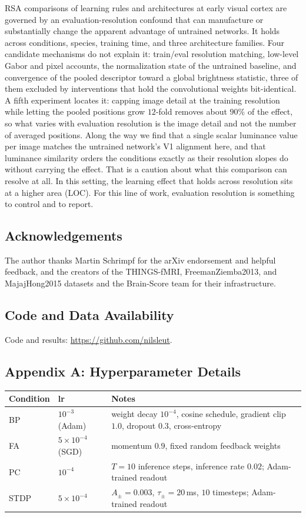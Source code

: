 \documentclass[10pt,twocolumn]{article}
\begin{document}
RSA comparisons of learning rules and architectures at early visual cortex are governed by an evaluation-resolution confound that can manufacture or substantially change the apparent advantage of untrained networks. It holds across conditions, species, training time, and three architecture families. Four candidate mechanisms do not explain it: train/eval resolution matching, low-level Gabor and pixel accounts, the normalization state of the untrained baseline, and convergence of the pooled descriptor toward a global brightness statistic, three of them excluded by interventions that hold the convolutional weights bit-identical. A fifth experiment locates it: capping image detail at the training resolution while letting the pooled positions grow $12$-fold removes about $90\%$ of the effect, so what varies with evaluation resolution is the image detail and not the number of averaged positions. Along the way we find that a single scalar luminance value per image matches the untrained network's V1 alignment here, and that luminance similarity orders the conditions exactly as their resolution slopes do without carrying the effect. That is a caution about what this comparison can resolve at all. In this setting, the learning effect that holds across resolution sits at a higher area (LOC). For this line of work, evaluation resolution is something to control and to report.

\subsection*{Acknowledgements}
The author thanks Martin Schrimpf for the arXiv endorsement and helpful feedback, and the creators of the THINGS-fMRI, FreemanZiemba2013, and MajajHong2015 datasets and the Brain-Score team for their infrastructure.

\subsection*{Code and Data Availability}
Code and results: \url{https://github.com/nilsleut}.

\subsection*{Appendix A: Hyperparameter Details}
\begingroup
\footnotesize
\begin{tabular}{@{}llp{3.3cm}@{}}
\toprule
Condition & lr & Notes \\
\midrule
BP & $10^{-3}$ (Adam) & weight decay $10^{-4}$, cosine schedule, gradient clip $1.0$, dropout $0.3$, cross-entropy \\
FA & $5\times10^{-4}$ (SGD) & momentum $0.9$, fixed random feedback weights \\
PC & $10^{-4}$ & $T=10$ inference steps, inference rate $0.02$; Adam-trained readout \\
STDP & $5\times10^{-4}$ & $A_\pm=0.003$, $\tau_\pm=20$\,ms, $10$ timesteps; Adam-trained readout \\
\bottomrule
\end{tabular}
\endgroup
\end{document}

